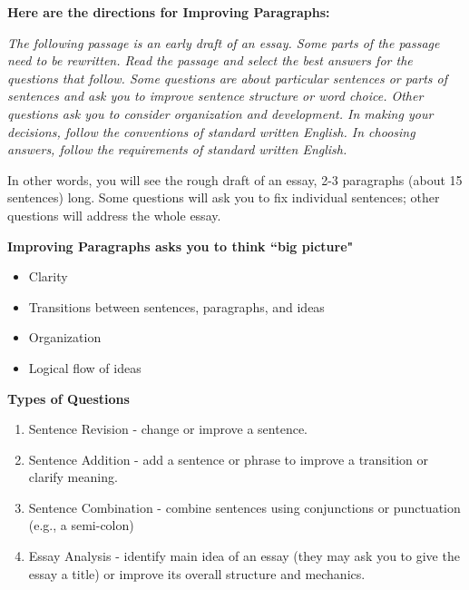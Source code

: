 \documentclass[12pt]{book}
\begin{document}
\textbf{Here are the directions for Improving Paragraphs:}
\begin{center}
\textit{The following passage is an early draft of an essay. Some parts of the passage need to be rewritten.
Read the passage and select the best answers for the questions that follow. Some questions are about particular sentences or parts of sentences and ask you to improve sentence structure or word choice. Other questions ask you to consider organization and development. In making your decisions, follow the conventions of standard written English. In choosing answers, follow the requirements of standard written English.}
\end{center}

\bigskip
In other words, you will see the rough draft of an essay, 2-3 paragraphs (about 15 sentences) long.  Some questions will ask you to fix individual sentences; other questions will address the whole essay.


\bigskip   %

\bigskip
\textbf{Improving Paragraphs asks you to think ``big picture"}
\begin{itemize}
\item{Clarity}
\item{Transitions between sentences, paragraphs, and ideas}
\item{Organization}
\item{Logical flow of ideas}
\end{itemize}

\bigskip

\bigskip
\textbf{Types of Questions}
\begin{enumerate}
\item{Sentence Revision - change or improve a sentence.}
\item{Sentence Addition - add a sentence or phrase to improve a transition or clarify meaning.}
\item{Sentence Combination - combine sentences using conjunctions or punctuation (e.g., a semi-colon)}
\item{Essay Analysis - identify main idea of an essay (they may ask you to give the essay a title) or improve its overall structure and mechanics.}
\end{enumerate}

\bigskip
\end{document}
